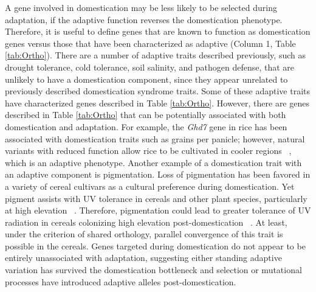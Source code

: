 \documentclass[12pt]{article}
\begin{document}
A gene involved in domestication may be less likely to be selected during adaptation, if the adaptive function reverses the domestication phenotype. 
Therefore, it is useful to define genes that are known to function as domestication genes versus those that have been characterized as adaptive (Column 1, Table \ref{tab:Ortho}).
There are a number of adaptive traits described previously, such as drought tolerance, cold tolerance, soil salinity, and pathogen defense, that are unlikely to have a domestication component, since they appear unrelated to previously described domestication syndrome traits.
Some of these adaptive traits have characterized genes described in Table \ref{tab:Ortho}.
However, there are genes described in Table \ref{tab:Ortho} that can be potentially associated with both domestication and adaptation.
For example, the \emph{Ghd7} gene in rice has been associated with domestication traits such as grains per panicle; however, natural variants with reduced function allow rice to be cultivated in cooler regions ~\citep{Xue2008}, which is an adaptive phenotype. 
Another example of a domestication trait with an adaptive component is pigmentation.
Loss of pigmentation has been favored in a variety of cereal cultivars as a cultural preference during domestication.
Yet pigment assists with UV tolerance in cereals and other plant species, particularly at high elevation ~\citep{pmid8058838, Gould2004}.
Therefore, pigmentation could lead to greater tolerance of UV radiation in cereals colonizing high elevation post-domestication ~\citep{Pyhjrvi2013}.
At least, under the criterion of shared orthology, parallel convergence of this trait is possible in the cereals.
Genes targeted during domestication do not appear to be entirely unassociated with adaptation, suggesting either standing adaptive variation has survived the domestication bottleneck and selection or mutational processes have introduced adaptive alleles post-domestication.
\end{document}
